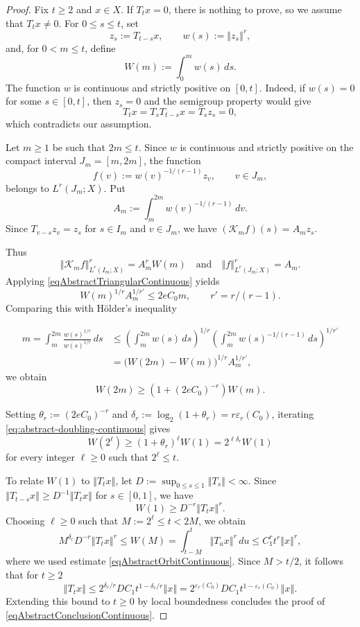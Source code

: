 \documentclass[12pt]{amsart}
\theoremstyle{plain}
\theoremstyle{remark}
\theoremstyle{definition}
\newcommand{\norm}[1]{\left\Vert #1\right\Vert}
\begin{document}
	\begin{proof}
		Fix $t\ge2$ and $x\in X$. If $T_tx=0$, there is nothing to prove, so we
		assume that $T_tx\neq0$. For $0\le s\le t$, set
		\[
		z_s:=T_{t-s}x,
		\qquad
		w(s):=\norm{z_s}^r,
		\]
		and, for $0<m\le t$, define
		\[
		W(m):=\int_0^m w(s)\,ds.
		\]
		The function $w$ is continuous and strictly positive on $[0,t]$. Indeed,
		if $w(s)=0$ for some $s\in[0,t]$, then $z_s=0$ and the semigroup property
		would give
		\[
		T_tx=T_sT_{t-s}x=T_sz_s=0,
		\]
		which contradicts our assumption.
		
		Let $m\ge1$ be such that $2m\le t$. Since $w$ is continuous and strictly
		positive on the compact interval $J_m=[m,2m]$, the function
		\[
		f(v):=w(v)^{-1/(r-1)}z_v,
		\qquad v\in J_m,
		\]
		belongs to $L^r(J_m;X)$. Put
		\[
		A_m
		:=
		\int_m^{2m}w(v)^{-1/(r-1)}\,dv.
		\] Since $T_{v-s}z_v = z_s$ for $s\in I_m$ and $v\in J_m$, we have $(\mathcal K_mf)(s) = A_mz_s$.
		
		Thus \[\norm{\mathcal K_mf}_{L^r(I_m;X)}^r = A_m^rW(m) \quad  \text{and} \quad  \norm{f}_{L^r(J_m;X)}^r = A_m.\]
		Applying  \eqref{eqAbstractTriangularContinuous} yields
		\begin{equation*}\label{eqAbstractArContinuous}
			W(m)^{1/r}A_m^{1/r'} \le 2eC_0m, \qquad r'=r/(r-1).
		\end{equation*}
		Comparing this with Hölder's inequality 
		
		\begin{align*}
			m = \int_m^{2m} \frac{w(s)^{1/r}}{w(s)^{1/r}} \, ds 
			&\le \left( \int_m^{2m} w(s) \, ds \right)^{1/r} \left( \int_m^{2m} w(s)^{-1/(r-1)} \, ds \right)^{1/r'} \\
			&= \bigl(W(2m)-W(m)\bigr)^{1/r} A_m^{1/r'},
		\end{align*} we obtain
		\begin{equation}\label{eq:abstract-doubling-continuous}
			W(2m) \ge \left(1+(2eC_0)^{-r}\right)W(m).
		\end{equation}
		
		Setting $\theta_r:=(2eC_0)^{-r}$ and $\delta_r:=\log_2(1+\theta_r) = r\varepsilon_r(C_0)$, iterating \eqref{eq:abstract-doubling-continuous} gives
		\[
		W(2^\ell) \ge (1+\theta_r)^\ell W(1) = 2^{\ell\delta_r}W(1)
		\]
		for every integer $\ell\ge0$ such that $2^\ell\le t$.
		
		To relate $W(1)$ to $\norm{T_tx}$, let $D:=\sup_{0\le s\le1}\norm{T_s}<\infty$. Since $\norm{T_{t-s}x} \ge D^{-1}\norm{T_tx}$ for $s\in[0,1]$,
		we have \[
		W(1) \ge D^{-r}\norm{T_tx}^r.\]
		Choosing $\ell\ge0$ such that $M:=2^\ell \le t < 2M$, we obtain
		\[
		M^{\delta_r}D^{-r}\norm{T_tx}^r \le W(M) = \int_{t-M}^t \norm{T_ux}^r\,du \le C_1^rt^r\norm{x}^r,
		\]
		where we used estimate \eqref{eqAbstractOrbitContinuous}. Since $M>t/2$, it follows that for $t\ge 2$
		\[
		\norm{T_tx} \le 2^{\delta_r/r}DC_1 t^{1-\delta_r/r}\norm{x} = 2^{\varepsilon_r(C_0)}DC_1 t^{1-\varepsilon_r(C_0)}\norm{x}.
		\]
		Extending this bound to $t\ge 0$ by local boundedness concludes the proof of \eqref{eqAbstractConclusionContinuous}.
	\end{proof}
	
\end{document}
